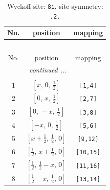 \documentclass[fleqn,8pt]{jsarticle}
\begin{document}
\begin{longtable}{ccc}
\caption{Wyckoff site: {\tt 8i}, site symmetry: {\tt .2.}}
 \\
 \hline \hline
No. & position & mapping \\ \hline \endfirsthead

\multicolumn{2}{l}{\tablename\ \thetable{}} \\
 \hline \hline
No. & position & mapping \\ \hline \endhead

 \hline \hline
\multicolumn{2}{r}{\footnotesize\it continued ...} \\ \endfoot

 \hline \hline
\multicolumn{2}{r}{} \\ \endlastfoot

1 & $\left[ x,\, 0,\, \frac{1}{2} \right]$ & {\tt [1,4]} \\ \hline
2 & $\left[ 0,\, x,\, \frac{1}{2} \right]$ & {\tt [2,7]} \\ \hline
3 & $\left[ 0,\, - x,\, \frac{1}{2} \right]$ & {\tt [3,8]} \\ \hline
4 & $\left[ - x,\, 0,\, \frac{1}{2} \right]$ & {\tt [5,6]} \\ \hline
5 & $\left[ x + \frac{1}{2},\, \frac{1}{2},\, 0 \right]$ & {\tt [9,12]} \\ \hline
6 & $\left[ \frac{1}{2},\, x + \frac{1}{2},\, 0 \right]$ & {\tt [10,15]} \\ \hline
7 & $\left[ \frac{1}{2},\, \frac{1}{2} - x,\, 0 \right]$ & {\tt [11,16]} \\ \hline
8 & $\left[ \frac{1}{2} - x,\, \frac{1}{2},\, 0 \right]$ & {\tt [13,14]} \\
\end{longtable}
\renewcommand{\arraystretch}{1.2}
\end{document}
